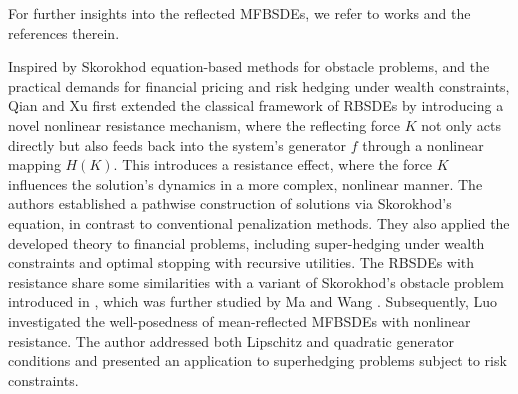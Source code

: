 \documentclass[10pt]{article}%
\numberwithin{equation}{section}
\begin{document}
For further insights into the reflected MFBSDEs, {we refer to works \cite{CHM,DD,DDZ,DEH,HMW',HMW} and the references therein.} %

{Inspired by Skorokhod equation-based methods for obstacle problems, and the practical demands for financial pricing and risk hedging under wealth constraints,}  Qian and Xu \cite{QX}  first extended the classical framework of RBSDEs by introducing a novel nonlinear resistance mechanism, where the reflecting force $K$ not only acts directly but also feeds back into the system's generator $f$  through a nonlinear mapping $H(K)$. This introduces a resistance effect, where the force $K$ influences the solution's dynamics in a more complex, nonlinear manner. %
{The authors  established a pathwise construction of solutions via Skorokhod’s equation, in contrast to conventional penalization methods. They also applied the developed theory to financial problems, including super-hedging under wealth constraints and optimal stopping with recursive utilities. The RBSDEs with resistance share some similarities with a variant of Skorokhod's obstacle problem introduced in \cite{BEK}, which was further studied by Ma and Wang \cite{MW}.} {Subsequently, Luo \cite{LP}  investigated the well-posedness of mean-reflected MFBSDEs with nonlinear resistance. The author addressed both Lipschitz and quadratic generator conditions and presented an application to superhedging problems subject to risk constraints.} %
\end{document}
